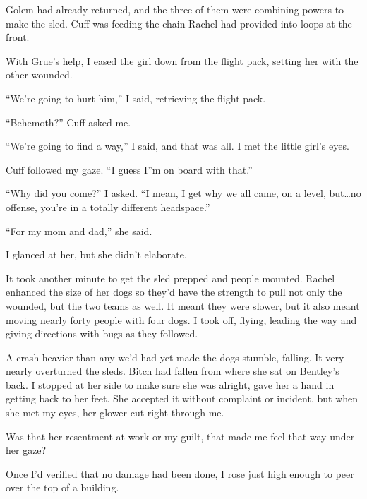Golem had already returned, and the three of them were combining powers to make the sled.  Cuff was feeding the chain Rachel had provided into loops at the front.



With Grue's help, I eased the girl down from the flight pack, setting her with the other wounded.



``We're going to hurt him,'' I said, retrieving the flight pack.



``Behemoth?'' Cuff asked me.



``We're going to find a way,'' I said, and that was all.  I met the little girl's eyes.



Cuff followed my gaze.  ``I guess I''m on board with that.''



``Why did you come?''  I asked.  ``I mean, I get why we all came, on a level, but\ldots no offense, you're in a totally different headspace.''



``For my mom and dad,'' she said.



I glanced at her, but she didn't elaborate.



It took another minute to get the sled prepped and people mounted.  Rachel enhanced the size of her dogs so they'd have the strength to pull not only the wounded, but the two teams as well.  It meant they were slower, but it also meant moving nearly forty people with four dogs.  I took off, flying, leading the way and giving directions with bugs as they followed.



A crash heavier than any we'd had yet made the dogs stumble, falling.  It very nearly overturned the sleds.  Bitch had fallen from where she sat on Bentley's back.  I stopped at her side to make sure she was alright, gave her a hand in getting back to her feet.  She accepted it without complaint or incident, but when she met my eyes, her glower cut right through me.



Was that her resentment at work or my guilt, that made me feel that way under her gaze?



Once I'd verified that no damage had been done, I rose just high enough to peer over the top of a building.



